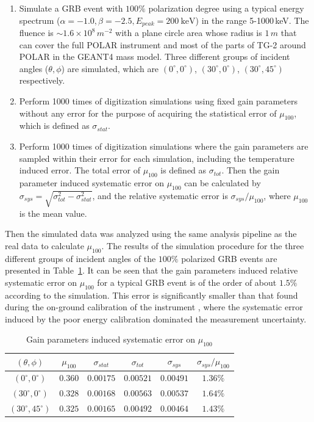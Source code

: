 \documentclass[preprint,sort&compress,12pt]{elsarticle}
\begin{document}
\begin{enumerate}[Step 1.]
\item Simulate a GRB event with $100\%$ polarization degree using a typical energy spectrum ($\alpha = -1.0, \beta = -2.5, E_{peak} = 200~\mathrm{keV}$) in the range 5-1000\,keV. The fluence is $\sim 1.6 \times 10^8\,m^{-2}$ with a plane circle area whose radius is $1\,m$ that can cover the full POLAR instrument and most of the parts of TG-2 around POLAR in the GEANT4 mass model. Three different groups of incident angles ($\theta, \phi$) are simulated, which are $(0^\circ, 0^\circ)$, $(30^\circ, 0^\circ)$, $(30^\circ, 45^\circ)$ respectively.
\item Perform 1000 times of digitization simulations using fixed gain parameters without any error for the purpose of acquiring the statistical error of $\mu_{100}$, which is defined as $\sigma_{stat}$.
\item Perform 1000 times of digitization simulations where the gain parameters are sampled within their error for each simulation, including the temperature induced error. The total error of $\mu_{100}$ is defined as $\sigma_{tot}$. Then the gain parameter induced systematic error on $\mu_{100}$ can be calculated by $\sigma_{sys}=\sqrt{\sigma_{tot}^2-\sigma_{stat}^2}$, and the relative systematic error is $\sigma_{sys} / \mu_{100}$, where $\mu_{100}$ is the mean value.
\end{enumerate}

Then the simulated data was analyzed using the same analysis pipeline as the real data to calculate $\mu_{100}$. The results of the simulation procedure for the three different groups of incident angles of the $100\%$ polarized GRB events are presented in Table~\ref{tab:gain_sys_error}. It can be seen that the gain parameters induced relative systematic error on $\mu_{100}$ for a typical GRB event is of the order of about $1.5\%$ according to the simulation. This error is significantly smaller than that found during the on-ground calibration of the instrument \cite{Kole2017}, where the systematic error induced by the poor energy calibration dominated the measurement uncertainty.

\begin{table}[!ht]
\centering
\caption{Gain parameters induced systematic error on $\mu_{100}$}\label{tab:gain_sys_error}
\begin{tabular}{|c|c|c|c|c|c|}\hline
$(\theta, \phi)$ & $\mu_{100}$ & $\sigma_{stat}$ & $\sigma_{tot}$ & $\sigma_{sys}$ & $\sigma_{sys} / \mu_{100}$ \\\hline
$(0^\circ, 0^\circ)$ & $0.360$ & $0.00175$ & $0.00521$ & $0.00491$ & $1.36\%$ \\\hline
$(30^\circ, 0^\circ)$ & $0.328$ & $0.00168$ & $0.00563$ & $0.00537$ & $1.64\%$ \\\hline
$(30^\circ, 45^\circ)$ & $0.325$ & $0.00165$ & $0.00492$ & $0.00464$ & $1.43\%$ \\\hline
\end{tabular}
\end{table}
\end{document}
